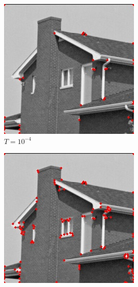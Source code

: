 \documentclass[10pt,a4paper,twoside]{article}
\newcommand{\sweepsize}{0.26}
\begin{document}
\begin{figure}[h]
    \begin{subfigure}{\sweepsize\textwidth}
    \includegraphics[width=0.9\linewidth, height=0.9\linewidth]{sweep_house/house_10_005_00001.jpg} 
    \caption{$T=10^{-4}$}
    \end{subfigure}
    \begin{subfigure}{\sweepsize\textwidth}
    \includegraphics[width=0.9\linewidth, height=0.9\linewidth]{sweep_house/house_10_005_1e-05.jpg} 

\end{subfigure}
\end{figure}
\end{document}

